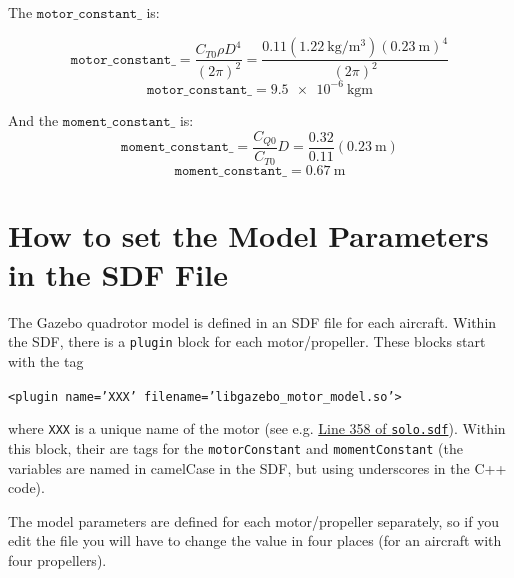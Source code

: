 \documentclass[12pt]{article}
\begin{document}
The $\mathtt{motor\_constant\_}$ is:

\begin{equation}
\mathtt{motor\_constant\_} = \frac{C_{T0} \rho D^4}{(2 \pi)^2} = \frac{0.11 (\SI{1.22}{\kilogram\per\meter\cubed}) (\SI{0.23}{\meter})^4}{(2 \pi)^2}
\end{equation}
\begin{equation}
\mathtt{motor\_constant\_} = \SI{9.5e-6}{\kilogram\meter}
\end{equation}

And the $\mathtt{moment\_constant\_}$ is:
\begin{equation}
\mathtt{moment\_constant\_} = \frac{C_{Q0}}{C_{T0}} D = \frac{0.32}{0.11} (\SI{0.23}{\meter})
\end{equation}
\begin{equation}
\mathtt{moment\_constant\_} = \SI{0.67}{\meter}
\end{equation}


\section{How to set the Model Parameters in the SDF File}
The Gazebo quadrotor model is defined in an SDF file for each aircraft. Within the SDF, there is a \texttt{plugin} block for each motor/propeller. These blocks start with the tag

\texttt{<plugin name='XXX' filename='libgazebo\_motor\_model.so'>}

where \texttt{XXX} is a unique name of the motor (see e.g. \href{https://github.com/PX4/sitl_gazebo/blob/d08eb5b22d3edfb7a740c883b06f895a173b5519/models/solo/solo.sdf#L358}{Line 358 of \texttt{solo.sdf}}). Within this block, their are tags for the \texttt{motorConstant} and \texttt{momentConstant} (the variables are named in camelCase in the SDF, but using underscores in the C++ code).

The model parameters are defined for each motor/propeller separately, so if you edit the file you will have to change the value in four places (for an aircraft with four propellers).

\printbibliography
\end{document}
